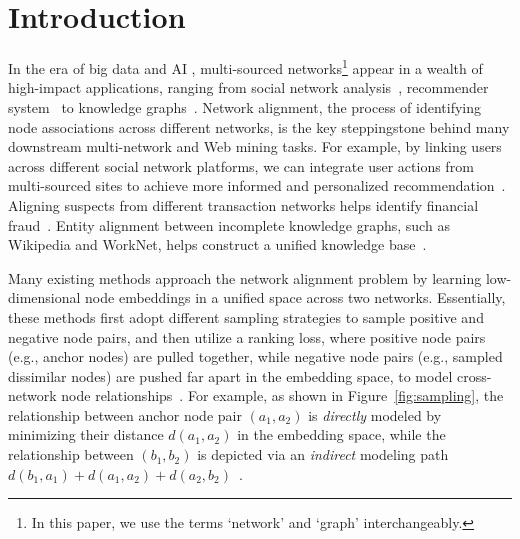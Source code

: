 \vspace{-5pt}
\section{Introduction}\label{sec:intro}

In the era of big data and AI \cite{ban2021ee,ban2023neural,qiu2024ask}, multi-sourced networks\footnote{In this paper, we use the terms `network' and `graph' interchangeably.} appear in a wealth of high-impact applications, ranging from social network analysis~\cite{yao2014dual, cao2017joint,xuslog,yan2024thegcn}, recommender system~\cite{fu2024vcr,liuclass,fu2024parametric} to knowledge graphs~\cite{wang2018acekg, wu2019relation,wang2023noisy,li2024apex}.
Network alignment, the process of identifying node associations across different networks, is the key steppingstone behind many downstream multi-network and Web mining tasks.
For example, by linking users across different social network platforms, we can integrate user actions from multi-sourced sites to achieve more informed and personalized recommendation~\cite{yao2014dual, yan2024pacer, crossmna}. 
Aligning suspects from different transaction networks helps identify financial fraud~\cite{moana,nextalign,du2021new,yan2024topological}.
Entity alignment between incomplete knowledge graphs, such as Wikipedia and WorkNet, helps construct a unified knowledge base~\cite{wu2019relation, chen2016multilingual, yan2021dynamic}.

Many existing methods approach the network alignment problem by learning low-dimensional node embeddings in a unified space across two networks.
Essentially, these methods first adopt different sampling strategies to sample positive and negative node pairs, and then utilize a ranking loss, where positive node pairs (e.g., anchor nodes) are pulled together, while negative node pairs (e.g., sampled dissimilar nodes) are pushed far apart in the embedding space, to model cross-network node relationships~\cite{ione, crossmna, bright, nextalign}.
For example, as shown in Figure~\ref{fig:sampling}, the relationship between anchor node pair $(a_1,a_2)$ is \textit{directly} modeled by minimizing their distance $d(a_1,a_2)$ in the embedding space, while the relationship between $(b_1,b_2)$ is depicted via an \textit{indirect} modeling path $d(b_1,a_1)+d(a_1,a_2)+d(a_2,b_2)$~\cite{bright}. 

